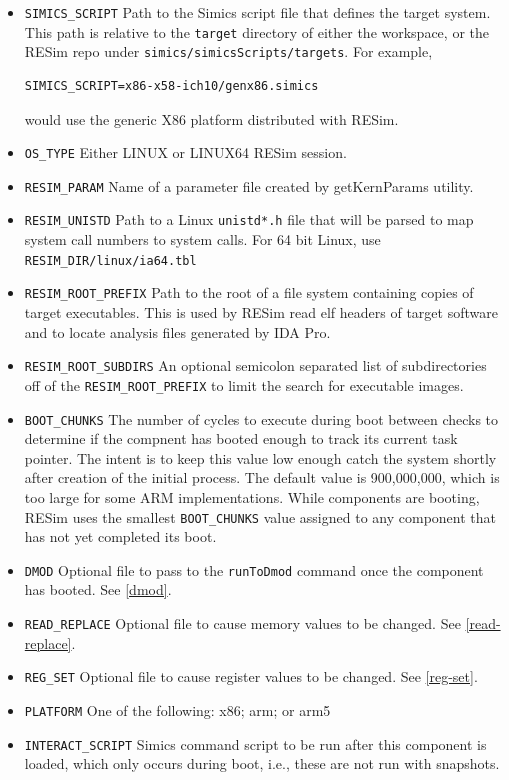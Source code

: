 \documentclass[titlepage]{article}
\begin{document}
\begin{itemize}
\item {\tt SIMICS\_SCRIPT} Path to the Simics script file that defines the target system.  This path is relative to the {\tt target} directory
of either the workspace, or the RESim repo under {\tt simics/simicsScripts/targets}.  For example, 
\begin{verbatim}
SIMICS_SCRIPT=x86-x58-ich10/genx86.simics
\end{verbatim}
\noindent would use the generic X86 platform distributed with RESim.
\item {\tt OS\_TYPE} Either LINUX or LINUX64
RESim session.
\item {\tt RESIM\_PARAM} Name of a parameter file created by getKernParams utility.
\item {\tt RESIM\_UNISTD} Path to a Linux {\tt unistd*.h} file that will be parsed to map system call numbers to system calls.  For 64 bit
Linux, use {\tt RESIM\_DIR/linux/ia64.tbl}
\item {\tt RESIM\_ROOT\_PREFIX} Path to the root of a file system containing copies of target executables.  This is used by RESim read elf
headers of target software and to locate analysis files generated by IDA Pro. 
\item {\tt RESIM\_ROOT\_SUBDIRS} An optional semicolon separated list of subdirectories off of the {\tt RESIM\_ROOT\_PREFIX} to limit the 
search for executable images.
\item {\tt BOOT\_CHUNKS} The number of cycles to execute during boot between checks to determine if the compnent has booted enough to track
its current task pointer.  The intent is to keep this value low enough catch the system shortly after creation of the initial process.
The default value is 900,000,000, which is too large for some ARM implementations.  While components are booting, RESim uses the smallest
{\tt BOOT\_CHUNKS} value assigned to any component that has not yet completed its boot.
\item {\tt DMOD} Optional file to pass to the {\tt runToDmod} command once the component has booted.  See \ref{dmod}.
\item {\tt READ\_REPLACE} Optional file to cause memory values to be changed.  See \ref{read-replace}.
\item {\tt REG\_SET} Optional file to cause register values to be changed.  See \ref{reg-set}.
\item {\tt PLATFORM} One of the following: x86; arm; or arm5
\item {\tt INTERACT\_SCRIPT} Simics command script to be run after this component is loaded, which only occurs during boot, i.e., these are not run with snapshots.

\end{itemize}
\end{document}
